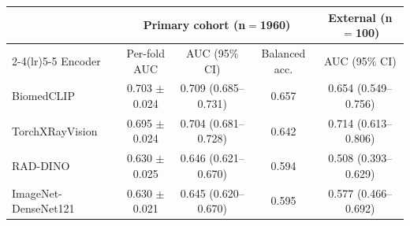 \begin{tabular}{lcccc}
\toprule
& \multicolumn{3}{c}{Primary cohort (n$=$1960)} & External (n$=$100) \\
\cmidrule(lr){2-4}\cmidrule(lr){5-5}
Encoder & Per-fold AUC & AUC (95\% CI) & Balanced acc. & AUC (95\% CI) \\
\midrule
BiomedCLIP & 0.703 $\pm$ 0.024 & 0.709 (0.685--0.731) & 0.657 & 0.654 (0.549--0.756) \\
TorchXRayVision & 0.695 $\pm$ 0.024 & 0.704 (0.681--0.728) & 0.642 & 0.714 (0.613--0.806) \\
RAD-DINO & 0.630 $\pm$ 0.025 & 0.646 (0.621--0.670) & 0.594 & 0.508 (0.393--0.629) \\
ImageNet-DenseNet121 & 0.630 $\pm$ 0.021 & 0.645 (0.620--0.670) & 0.595 & 0.577 (0.466--0.692) \\
\bottomrule
\end{tabular}
